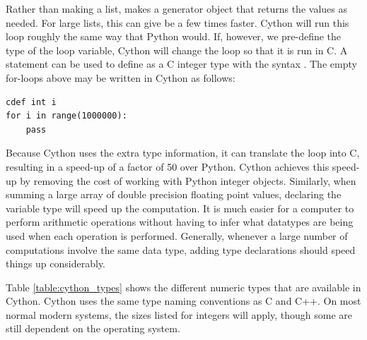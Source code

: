Rather than making a list,  makes a generator object that returns the values as needed.
For large lists, this can give be a few times faster.
Cython will run this loop roughly the same way that Python would.
If, however, we pre-define the type of the loop variable, Cython will change the loop so that it is run in C.
A  statement can be used to define  as a C integer type with the syntax .
The empty for-loops above may be written in Cython as follows:
\begin{lstlisting}
cdef int i
for i in range(1000000):
    pass
\end{lstlisting}

Because Cython uses the extra type information, it can translate the loop into C, resulting in a speed-up of a factor of 50 over Python.
Cython achieves this speed-up by removing the cost of working with Python integer objects.
Similarly, when summing a large array of double precision floating point values, declaring the variable type will speed up the computation.
It is much easier for a computer to perform arithmetic operations without having to infer what datatypes are being used when each operation is performed.
Generally, whenever a large number of computations involve the same data type, adding type declarations should speed things up considerably.

Table \ref{table:cython_types} shows the different numeric types that are available in Cython.
Cython uses the same type naming conventions as C and C++.
On most normal modern systems, the sizes listed for integers will apply, though some are still dependent on the operating system.

